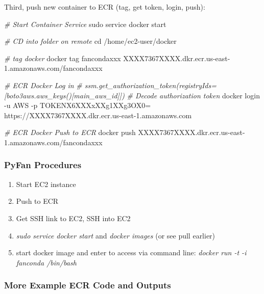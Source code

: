 \documentclass[
]{book}
\newenvironment{Shaded}{\begin{snugshade}}{\end{snugshade}}
\newcommand{\BuiltInTok}[1]{#1}
\newcommand{\CommentTok}[1]{\textcolor[rgb]{0.56,0.35,0.01}{\textit{#1}}}
\newcommand{\ExtensionTok}[1]{#1}
\newcommand{\FunctionTok}[1]{\textcolor[rgb]{0.00,0.00,0.00}{#1}}
\newcommand{\NormalTok}[1]{#1}
\providecommand{\tightlist}{%
  \setlength{\itemsep}{0pt}\setlength{\parskip}{0pt}}
\begin{document}
Third, push new container to ECR (tag, get token, login, push):

\begin{Shaded}
\begin{Highlighting}[]
\CommentTok{\# Start Container Service}
\FunctionTok{sudo}\NormalTok{ service docker start}

\CommentTok{\# CD into folder on remote}
\BuiltInTok{cd}\NormalTok{ /home/ec2{-}user/docker}

\CommentTok{\# tag docker}
\ExtensionTok{docker}\NormalTok{ tag fancondaxxx XXXX7367XXXX.dkr.ecr.us{-}east{-}1.amazonaws.com/fancondaxxx}

\CommentTok{\# ECR Docker Log in}
\CommentTok{\# ssm.get\_authorization\_token(registryIds=[boto3aws.aws\_keys()[\textquotesingle{}main\_aws\_id\textquotesingle{}]])}
\CommentTok{\# Decode authorization token}
\ExtensionTok{docker}\NormalTok{ login {-}u AWS {-}p TOKENX6XXXxXXg1XXg3OX0= https://XXXX7367XXXX.dkr.ecr.us{-}east{-}1.amazonaws.com}

\CommentTok{\# ECR Docker Push to ECR}
\ExtensionTok{docker}\NormalTok{ push XXXX7367XXXX.dkr.ecr.us{-}east{-}1.amazonaws.com/fancondaxxx}
\end{Highlighting}
\end{Shaded}

\hypertarget{pyfan-procedures}{%
\subsubsection{PyFan Procedures}\label{pyfan-procedures}}

\begin{enumerate}
\def\labelenumi{\arabic{enumi}.}
\tightlist
\item
  Start EC2 instance
\item
  Push to ECR
\item
  Get SSH link to EC2, SSH into EC2
\item
  \emph{sudo service docker start} and \emph{docker images} (or see pull earlier)
\item
  start docker image and enter to access via command line: \emph{docker run -t -i fanconda /bin/bash}
\end{enumerate}

\hypertarget{more-example-ecr-code-and-outputs}{%
\subsubsection{More Example ECR Code and Outputs}\label{more-example-ecr-code-and-outputs}}
\end{document}

